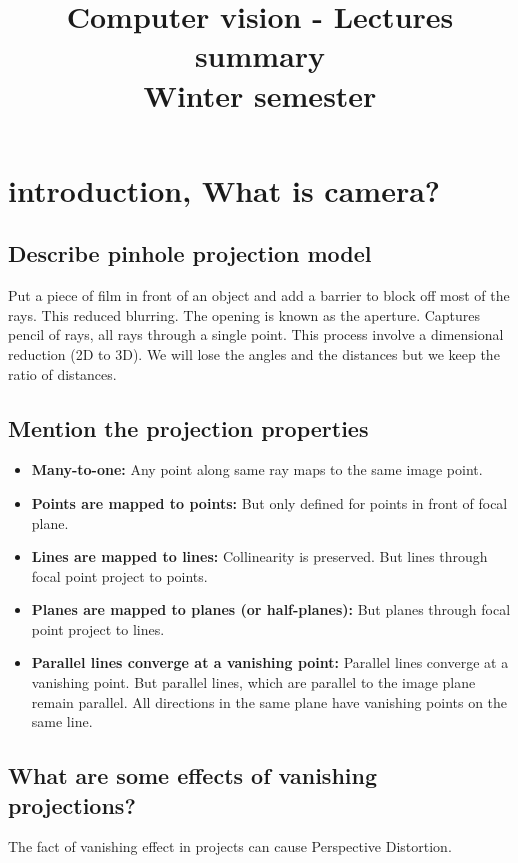 \documentclass{article}
\title{Computer vision - Lectures summary \\ Winter semester}
\begin{document}
\maketitle


\section{introduction, What is camera?}

\subsection{Describe pinhole projection model}
Put a piece of film in front of an object and add a barrier to block off most of the rays.
This reduced blurring. The opening is known as the aperture. Captures pencil of rays,  all rays through a single point. This process involve a dimensional reduction (2D to 3D). We will lose the angles and
the distances but we keep the ratio of distances.

\subsection{Mention the projection properties}
\begin{itemize}
    \item \textbf{Many-to-one: } Any point along same ray maps to the same image point.
    \item \textbf{Points are mapped to points: } But only defined for points in front of
        focal plane.
    \item \textbf{Lines are mapped to lines: } Collinearity is preserved. But lines through focal
        point project to points.
    \item \textbf{Planes are mapped to planes (or half-planes): } But planes through focal point
        project to lines.
    \item \textbf{Parallel lines converge at a vanishing point: } Parallel lines converge at a
        vanishing point. But parallel lines, which are parallel to the image plane remain parallel.
        All directions in the same plane have vanishing points on the same line.
\end{itemize}

\subsection{What are some effects of vanishing projections?}
The fact of vanishing effect in projects can cause Perspective Distortion.
\end{document}
